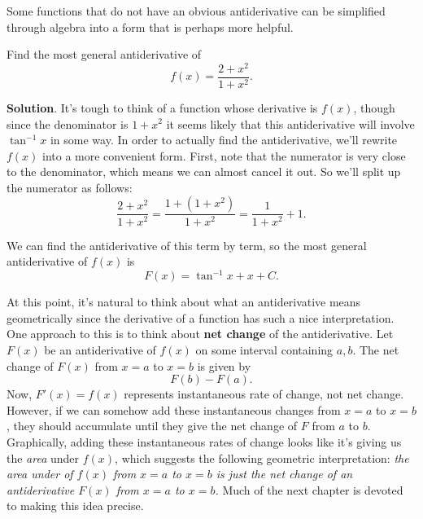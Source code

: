 \documentclass[10pt,]{book}
\newcommand{\terminology}[1]{\textbf{#1}}
\theoremstyle{ptxplainnotitle}
\theoremstyle{ptxplaintitle}
\theoremstyle{ptxplainnotitle}
\theoremstyle{ptxplaintitle}
\theoremstyle{ptxplainnotitle}
\theoremstyle{ptxplaintitle}
\theoremstyle{ptxdefinitionnotitle}
\theoremstyle{ptxdefinitiontitle}
\theoremstyle{ptxdefinitionnotitle}
\theoremstyle{ptxdefinitiontitle}
\theoremstyle{ptxdefinitionnotitle}
\theoremstyle{ptxdefinitiontitle}
\theoremstyle{ptxdefinitionnotitle}
\theoremstyle{ptxdefinitiontitle}
\theoremstyle{ptxdefinitionnotitle}
\theoremstyle{ptxdefinitiontitle}
\numberwithin{equation}{section}
\begin{document}
\hypertarget{p-396}{}%
Some functions that do not have an obvious antiderivative can be simplified through algebra into a form that is perhaps more helpful.%
\begin{example}\label{example-a-tricky-antiderivative}
\hypertarget{p-397}{}%
Find the most general antiderivative of%
\begin{equation*}
f(x) = \frac{2+x^{2}}{1+x^{2}}.
\end{equation*}
%
\par\smallskip%
\noindent\textbf{Solution}.\hypertarget{solution-89}{}\quad%
\hypertarget{p-398}{}%
It's tough to think of a function whose derivative is \(f(x)\), though since the denominator is \(1+x^{2}\) it seems likely that this antiderivative will involve \(\tan^{-1}x\) in some way. In order to actually find the antiderivative, we'll rewrite \(f(x)\) into a more convenient form. First, note that the numerator is very close to the denominator, which means we can almost cancel it out. So we'll split up the numerator as follows:%
\begin{equation*}
\frac{2+x^{2}}{1+x^{2}} = \frac{1+(1+x^{2})}{1+x^{2}} = \frac{1}{1+x^{2}} + 1.
\end{equation*}
%
\par
\hypertarget{p-399}{}%
We can find the antiderivative of this term by term, so the most general antiderivative of \(f(x)\) is%
\begin{equation*}
F(x) = \tan^{-1}x + x + C.
\end{equation*}
%
\end{example}
\hypertarget{p-400}{}%
At this point, it's natural to think about what an antiderivative means geometrically since the derivative of a function has such a nice interpretation. One approach to this is to think about \terminology{net change} of the antiderivative. Let \(F(x)\) be an antiderivative of \(f(x)\) on some interval containing \(a,b\). The net change of \(F(x)\) from \(x=a\) to \(x=b\) is given by%
\begin{equation*}
F(b) - F(a).
\end{equation*}
Now, \(F'(x) = f(x)\) represents instantaneous rate of change, not net change. However, if we can somehow add these instantaneous changes from \(x=a\) to \(x=b\), they should accumulate until they give the net change of \(F\) from \(a\) to \(b\). Graphically, adding these instantaneous rates of change looks like it's giving us the \emph{area} under \(f(x)\), which suggests the following geometric interpretation: \emph{the area under of \(f(x)\) from \(x=a\) to \(x=b\) is just the net change of an antiderivative \(F(x)\) from \(x=a\) to \(x=b\).} Much of the next chapter is devoted to making this idea precise.%
\typeout{************************************************}
\typeout{************************************************}
\end{document}
